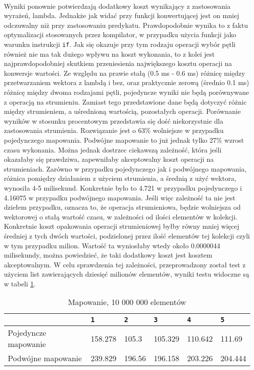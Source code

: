 \documentclass[a4paper,10pt]{report}
\begin{document}
\paragraph{}
Wyniki ponownie potwierdzają dodatkowy koszt wynikający z zastosowania wyrażeń, lambda. Jednakże jak widać przy funkcji konwertującej jest on mniej odczuwalny niż przy zastosowaniu predykatu. Prawdopodobnie wynika to z faktu optymalizacji stosowanych przez kompilator, w przypadku użycia funkcji jako warunku instrukcji \verb|if|. Jak się okazuje przy tym rodzaju operacji wybór pętli również nie ma tak dużego wpływu na koszt wykonania, to z kolei jest najprawdopodobniej skutkiem przeniesienia największego kosztu operacji na konwersje wartości. Ze względu na prawie stałą (0.5 ms - 0.6 ms) różnicę między przetwarzaniem wektora z lambdą i bez, oraz praktycznie zerową (średnio 0.1 ms) różnicę między dwoma rodzajami pętli, pojedyncze wyniki nie będą porównywane z operacją na strumieniu. Zamiast tego przedstawione dane będą dotyczyć różnic między strumieniem, a uśrednioną wartością, pozostałych operacji. Porównanie wyników w stosunku procentowym przedstawia się dość niekorzystnie dla zastosowania strumienia. Rozwiązanie jest o 63\% wolniejsze w przypadku pojedynczego mapowania. Podwójne mapowanie to już jednak tylko 27\% wzrost czasu wykonania. Można jednak dostrzec ciekawszą zależność, która jeśli okazałaby się prawdziwa, zapewniłaby akceptowalny koszt operacji na strumieniach. Zarówno w przypadku pojedynczego jak i podwójnego mapowania, różnica pomiędzy działaniem z użyciem strumienia, a średnią z użyć wektora, wynosiła 4-5 milisekund.
Konkretnie było to 4.721 w przypadku pojedynczego i 4.16075  w przypadku podwójnego mapowania. Jeśli więc zależność ta nie jest dziełem przypadku, oznacza to, że operacja strumieniowa, będzie wolniejsza od wektorowej o stałą wartość czasu, w zależności od ilości elementów w kolekcji. Konkretnie koszt opakowania operacji strumieniowej byłby równy mniej więcej średniej z tych dwóch wartości, podzielonej przez ilość elementów tej kolekcji czyli w tym przypadku milion. Wartość ta wyniosłaby wtedy około 0.0000044 milisekundy, można powiedzieć, że taki dodatkowy koszt jest kosztem akceptowalnym. W celu sprawdzenia tej zależności, przeprowadzony został test z użyciem list zawierających dziesięć milionów elementów, wyniki testu widoczne są w tabeli \ref{tab4}.
\begin{table}[t]
	\caption{Mapowanie, 10 000 000 elementów}
	\label{tab4}
	\begin{tabular}{|l|l|l|l|l|l|}
		\hline 
		& \verb|1| & \verb|2| & \verb|3| & \verb|4| & \verb|5|\\
		\hline
		Pojedyncze mapowanie & 158.278 &		105.3 &		105.329 &		110.642 &		111.69 \\
		\hline
		Podwójne mapowanie & 239.829 &		196.56 &		196.158 &		203.226 &		204.444 \\
		\hline
	\end{tabular} 
\end{table}
\end{document}
